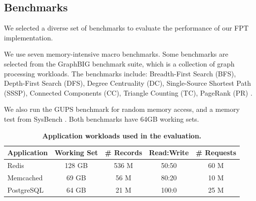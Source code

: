 \subsection{Benchmarks}

We selected a diverse set of benchmarks to evaluate the performance of our FPT implementation.

We use seven memory-intensive macro benchmarks. Some benchmarks are selected from the GraphBIG benchmark suite, which is a collection of graph processing workloads. The benchmarks include: 
    Breadth-First Search (BFS),
    Depth-First Search (DFS),
    Degree Centruality (DC),
    Single-Source Shortest Path (SSSP),
    Connected Components (CC),
    Triangle Counting (TC),
    PageRank (PR) \cite{graphbig}.

We also run the GUPS benchmark for random memory access, and a memory test from SysBench \cite{gups,sysbench}. Both benchmarks have 64GB working sets.

\begin{table}
    \centering
    \footnotesize
    \setlength{\tabcolsep}{2pt}
    \begin{tabular}{lcccc}
        \toprule
        \textbf{Application} & \textbf{Working Set} & {\bf \# Records} & \textbf{Read:Write} & {\bf \# Requests} \\
        \midrule
        Redis      & 128 GB & 536 M & 50:50 & 60 M \\
        Memcached  & 69 GB  & 56 M  & 80:20 &  10 M \\
        PostgreSQL & 64 GB  & 21 M & 100:0 & 25 M \\
        \bottomrule
    \end{tabular}
    \caption{\bf Application workloads used in the evaluation.}
    \label{table:workloads}
\end{table}

